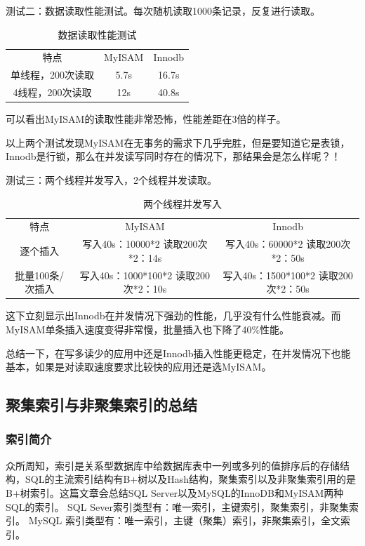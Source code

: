 \documentclass[UTF8]{ctexart}
\begin{document}
测试二：数据读取性能测试。每次随机读取1000条记录，反复进行读取。
\begin{table}[]
\caption{数据读取性能测试}
\vspace{20pt}
\centering
\begin{tabular}{c|c|c|}
\hline
特点     &   MyISAM     &   Innodb\\
单线程，200次读取      &   5.7s  &16.7s\\
4线程，200次读取       &   12s& 40.8s\\
\hline       
\end{tabular}
\label{bs5}
\end{table}
可以看出MyISAM的读取性能非常恐怖，性能差距在3倍的样子。

以上两个测试发现MyISAM在无事务的需求下几乎完胜，但是要知道它是表锁，Innodb是行锁，那么在并发读写同时存在的情况下，那结果会是怎么样呢？！

测试三：两个线程并发写入，2个线程并发读取。
\begin{table}[]
\caption{两个线程并发写入}
\vspace{20pt}
\centering
\begin{tabular}{c|c|c|}
\hline
特点    &  MyISAM                      &           Innodb\\
逐个插入              &  写入40s：10000*2 读取200次*2：14s     &   写入40s：60000*2 读取200次*2：50s\\
批量100条/次插入      &  写入40s：1000*100*2 读取200次*2：10s   &   写入40s：1500*100*2 读取200次*2：50s\\
\hline       
\end{tabular}
\label{bs5}
\end{table}

这下立刻显示出Innodb在并发情况下强劲的性能，几乎没有什么性能衰减。而MyISAM单条插入速度变得非常慢，批量插入也下降了40\%性能。

总结一下，在写多读少的应用中还是Innodb插入性能更稳定，在并发情况下也能基本，如果是对读取速度要求比较快的应用还是选MyISAM。
\subsection{聚集索引与非聚集索引的总结}
\subsubsection{索引简介}
众所周知，索引是关系型数据库中给数据库表中一列或多列的值排序后的存储结构，SQL的主流索引结构有B+树以及Hash结构，聚集索引以及非聚集索引用的是B+树索引。这篇文章会总结SQL Server以及MySQL的InnoDB和MyISAM两种 SQL的索引。
SQL Sever索引类型有：唯一索引，主键索引，聚集索引，非聚集索引。
MySQL 索引类型有：唯一索引，主键（聚集）索引，非聚集索引，全文索引。
\end{document}
